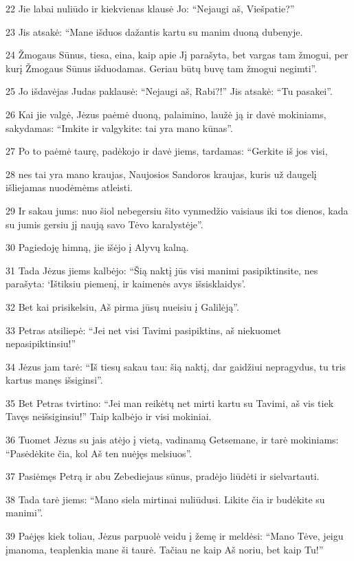 \par 22 Jie labai nuliūdo ir kiekvienas klausė Jo: “Nejaugi aš, Viešpatie?” 
\par 23 Jis atsakė: “Mane išduos dažantis kartu su manim duoną dubenyje. 
\par 24 Žmogaus Sūnus, tiesa, eina, kaip apie Jį parašyta, bet vargas tam žmogui, per kurį Žmogaus Sūnus išduodamas. Geriau būtų buvę tam žmogui negimti”. 
\par 25 Jo išdavėjas Judas paklausė: “Nejaugi aš, Rabi?!” Jis atsakė: “Tu pasakei”. 
\par 26 Kai jie valgė, Jėzus paėmė duoną, palaimino, laužė ją ir davė mokiniams, sakydamas: “Imkite ir valgykite: tai yra mano kūnas”. 
\par 27 Po to paėmė taurę, padėkojo ir davė jiems, tardamas: “Gerkite iš jos visi, 
\par 28 nes tai yra mano kraujas, Naujosios Sandoros kraujas, kuris už daugelį išliejamas nuodėmėms atleisti. 
\par 29 Ir sakau jums: nuo šiol nebegersiu šito vynmedžio vaisiaus iki tos dienos, kada su jumis gersiu jį naują savo Tėvo karalystėje”. 
\par 30 Pagiedoję himną, jie išėjo į Alyvų kalną. 
\par 31 Tada Jėzus jiems kalbėjo: “Šią naktį jūs visi manimi pasipiktinsite, nes parašyta: ‘Ištiksiu piemenį, ir kaimenės avys išsisklaidys’. 
\par 32 Bet kai prisikelsiu, Aš pirma jūsų nueisiu į Galilėją”. 
\par 33 Petras atsiliepė: “Jei net visi Tavimi pasipiktins, aš niekuomet nepasipiktinsiu!” 
\par 34 Jėzus jam tarė: “Iš tiesų sakau tau: šią naktį, dar gaidžiui nepragydus, tu tris kartus manęs išsiginsi”. 
\par 35 Bet Petras tvirtino: “Jei man reikėtų net mirti kartu su Tavimi, aš vis tiek Tavęs neišsiginsiu!” Taip kalbėjo ir visi mokiniai. 
\par 36 Tuomet Jėzus su jais atėjo į vietą, vadinamą Getsemane, ir tarė mokiniams: “Pasėdėkite čia, kol Aš ten nuėjęs melsiuos”. 
\par 37 Pasiėmęs Petrą ir abu Zebediejaus sūnus, pradėjo liūdėti ir sielvartauti. 
\par 38 Tada tarė jiems: “Mano siela mirtinai nuliūdusi. Likite čia ir budėkite su manimi”. 
\par 39 Paėjęs kiek toliau, Jėzus parpuolė veidu į žemę ir meldėsi: “Mano Tėve, jeigu įmanoma, teaplenkia mane ši taurė. Tačiau ne kaip Aš noriu, bet kaip Tu!” 
